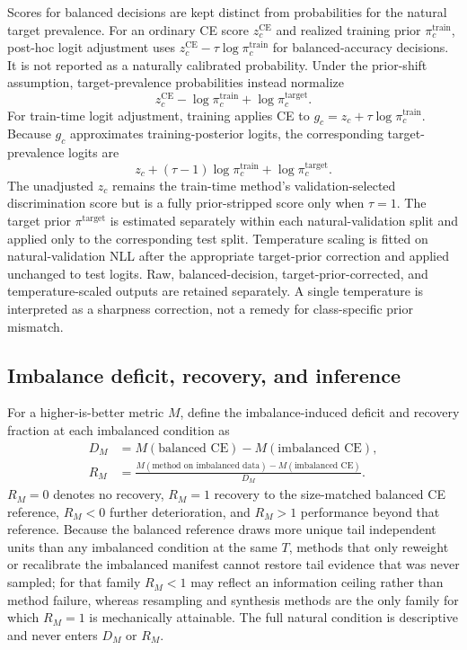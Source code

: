 \documentclass[11pt]{article}
\begin{document}
Scores for balanced decisions are kept distinct from probabilities for the natural target prevalence. For an ordinary CE score $z_c^{\mathrm{CE}}$ and realized training prior $\pi_c^{\mathrm{train}}$, post-hoc logit adjustment uses $z_c^{\mathrm{CE}}-\tau\log\pi_c^{\mathrm{train}}$ for balanced-accuracy decisions. It is not reported as a naturally calibrated probability. Under the prior-shift assumption, target-prevalence probabilities instead normalize
\begin{equation}
  z_c^{\mathrm{CE}}-\log\pi_c^{\mathrm{train}}
  +\log\pi_c^{\mathrm{target}}.
  \label{eq:posthoc-target-prior}
\end{equation}
\noindent For train-time logit adjustment, training applies CE to $g_c=z_c+\tau\log\pi_c^{\mathrm{train}}$. Because $g_c$ approximates training-posterior logits, the corresponding target-prevalence logits are
\begin{equation}
  z_c+(\tau-1)\log\pi_c^{\mathrm{train}}
  +\log\pi_c^{\mathrm{target}}.
  \label{eq:train-time-target-prior}
\end{equation}
\noindent The unadjusted $z_c$ remains the train-time method's validation-selected discrimination score but is a fully prior-stripped score only when $\tau=1$. The target prior $\pi^{\mathrm{target}}$ is estimated separately within each natural-validation split and applied only to the corresponding test split. Temperature scaling is fitted on natural-validation NLL after the appropriate target-prior correction and applied unchanged to test logits. Raw, balanced-decision, target-prior-corrected, and temperature-scaled outputs are retained separately. A single temperature is interpreted as a sharpness correction, not a remedy for class-specific prior mismatch.

\subsection{Imbalance deficit, recovery, and inference}
\label{sec:recovery}
For a higher-is-better metric $M$, define the imbalance-induced deficit and recovery fraction at each imbalanced condition as
\begin{equation}
  \begin{aligned}
    D_M &= M(\text{balanced CE})-M(\text{imbalanced CE}),\\
    R_M &= \frac{M(\text{method on imbalanced data})
      -M(\text{imbalanced CE})}{D_M}.
  \end{aligned}
  \label{eq:recovery}
\end{equation}
$R_M=0$ denotes no recovery, $R_M=1$ recovery to the size-matched balanced CE reference, $R_M<0$ further deterioration, and $R_M>1$ performance beyond that reference. Because the balanced reference draws more unique tail independent units than any imbalanced condition at the same $T$, methods that only reweight or recalibrate the imbalanced manifest cannot restore tail evidence that was never sampled; for that family $R_M<1$ may reflect an information ceiling rather than method failure, whereas resampling and synthesis methods are the only family for which $R_M=1$ is mechanically attainable. The full natural condition is descriptive and never enters $D_M$ or $R_M$.
\end{document}
